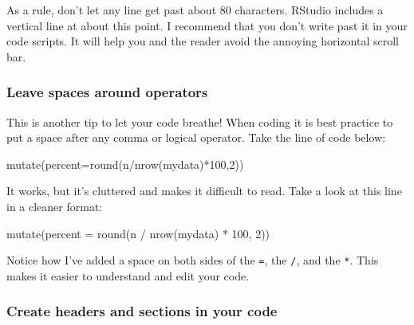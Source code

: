 \documentclass[
]{book}
\newenvironment{Shaded}{\begin{snugshade}}{\end{snugshade}}
\newcommand{\AttributeTok}[1]{\textcolor[rgb]{0.77,0.63,0.00}{#1}}
\newcommand{\DecValTok}[1]{\textcolor[rgb]{0.00,0.00,0.81}{#1}}
\newcommand{\FunctionTok}[1]{\textcolor[rgb]{0.00,0.00,0.00}{#1}}
\newcommand{\NormalTok}[1]{#1}
\newcommand{\SpecialCharTok}[1]{\textcolor[rgb]{0.00,0.00,0.00}{#1}}
\begin{document}
As a rule, don't let any line get past about 80 characters. RStudio includes a
vertical line at about this point. I recommend that you don't write past it in
your code scripts. It will help you and the reader avoid the annoying horizontal scroll bar.

\hypertarget{leave-spaces-around-operators-1}{%
\subsubsection*{Leave spaces around operators}\label{leave-spaces-around-operators-1}}

This is another tip to let your code breathe! When coding it is best practice to
put a space after any comma or logical operator. Take the line of code below:

\begin{Shaded}
\begin{Highlighting}[]
\FunctionTok{mutate}\NormalTok{(}\AttributeTok{percent=}\FunctionTok{round}\NormalTok{(n}\SpecialCharTok{/}\FunctionTok{nrow}\NormalTok{(mydata)}\SpecialCharTok{*}\DecValTok{100}\NormalTok{,}\DecValTok{2}\NormalTok{))}
\end{Highlighting}
\end{Shaded}

It works, but it's cluttered and makes it difficult to read. Take a look at this
line in a cleaner format:

\begin{Shaded}
\begin{Highlighting}[]
\FunctionTok{mutate}\NormalTok{(}\AttributeTok{percent =} \FunctionTok{round}\NormalTok{(n }\SpecialCharTok{/} \FunctionTok{nrow}\NormalTok{(mydata) }\SpecialCharTok{*} \DecValTok{100}\NormalTok{, }\DecValTok{2}\NormalTok{))}
\end{Highlighting}
\end{Shaded}

Notice how I've added a space on both sides of the \texttt{=}, the \texttt{/}, and the \texttt{*}. This makes it easier to understand and edit your code.

\hypertarget{create-headers-and-sections-in-your-code-1}{%
\subsubsection*{Create headers and sections in your code}\label{create-headers-and-sections-in-your-code-1}}
\end{document}
